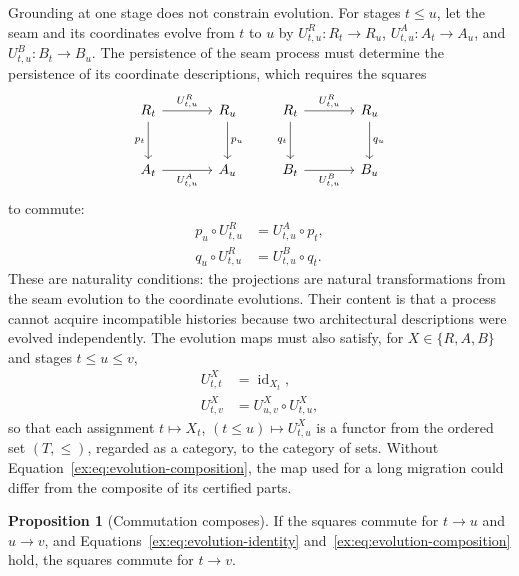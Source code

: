 \documentclass[11pt]{article}
\theoremstyle{definition}
\newtheorem{proposition}{Proposition}[section]
\begin{document}
Grounding at one stage does not constrain evolution. For stages $t\leq u$, let the seam and its coordinates evolve from $t$ to $u$ by
$U^{R}_{t,u}:R_t\to R_u$, $U^{A}_{t,u}:A_t\to A_u$, and $U^{B}_{t,u}:B_t\to B_u$. The persistence of the seam process must determine the persistence of its coordinate descriptions, which requires the squares
\begin{equation}\label{ex:eq:dynamic-squares}
\begin{tikzcd}[column sep=large,row sep=large,baseline=(current bounding box.center)]
R_t \arrow[r,"U^{R}_{t,u}"] \arrow[d,"p_t"']
  & R_u \arrow[d,"p_u"] \\
A_t \arrow[r,"U^{A}_{t,u}"'] & A_u
\end{tikzcd}
\qquad
\begin{tikzcd}[column sep=large,row sep=large,baseline=(current bounding box.center)]
R_t \arrow[r,"U^{R}_{t,u}"] \arrow[d,"q_t"']
  & R_u \arrow[d,"q_u"] \\
B_t \arrow[r,"U^{B}_{t,u}"'] & B_u
\end{tikzcd}
\end{equation}
to commute:
\begin{align}
p_{u}\circ U^R_{t,u} &=U^A_{t,u}\circ p_{t},\label{ex:eq:back-naturality}\\
q_{u}\circ U^R_{t,u} &=U^B_{t,u}\circ q_{t}. \label{ex:eq:fwd-naturality}
\end{align}
These are naturality conditions: the projections are natural transformations from the seam evolution to the coordinate evolutions. Their content is that a process cannot acquire incompatible histories because two architectural descriptions were evolved independently. The evolution maps must also satisfy, for $X \in \{R,A,B\}$ and stages $t\leq u\leq v$,
\begin{align}
U^{X}_{t,t} &=\operatorname{id}_{X_t},\label{ex:eq:evolution-identity}\\
U^{X}_{t,v} &=U^{X}_{u,v}\circ U^{X}_{t,u},\label{ex:eq:evolution-composition}
\end{align}
so that each assignment $t \mapsto X_t$, $(t\leq u)\mapsto U^X_{t,u}$ is a functor from the ordered set $(T,\leq)$, regarded as a category, to the category of sets. Without Equation~\eqref{ex:eq:evolution-composition}, the map used for a long migration could differ from the composite of its certified parts.

\begin{proposition}[Commutation composes]\label{ex:prop:commutation-composes}
If the squares commute for $t\to u$ and $u\to v$, and Equations~\eqref{ex:eq:evolution-identity} and~\eqref{ex:eq:evolution-composition} hold, the squares commute for $t\to v$.
\end{proposition}
\end{document}
